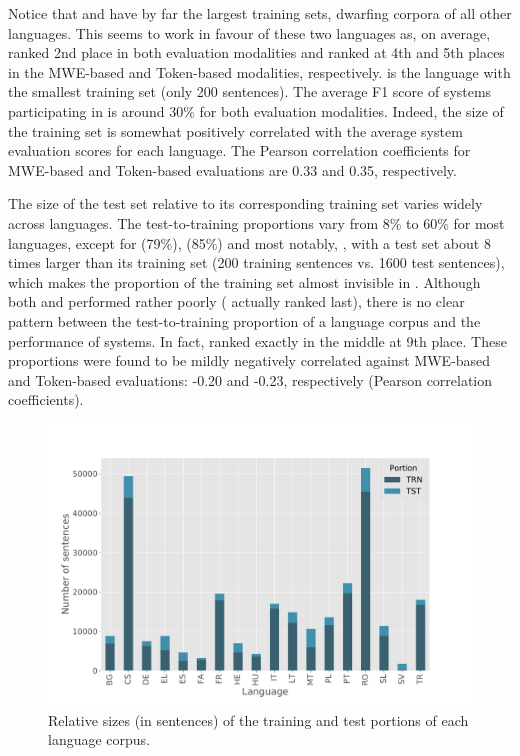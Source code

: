 \documentclass[output=paper
,modfonts
,nonflat,draftmode]{langsci/langscibook}
\begin{document}
Notice that  and  have by far the largest training sets, dwarfing corpora of all other languages. This seems to work in favour of these two languages as, on average,  ranked 2nd place in both evaluation modalities and  ranked at 4th and 5th places in the MWE-based and Token-based modalities, respectively.  is the language with the smallest training set (only 200 sentences). The average F1 score of systems participating in  is around 30\% for both evaluation modalities. Indeed, the size of the training set is somewhat positively correlated with the average system evaluation scores for each language. The Pearson correlation coefficients for MWE-based and Token-based evaluations are 0.33 and 0.35, respectively.

The size of the test set relative to its corresponding training set varies widely across languages. The test-to-training proportions vary from 8\% to 60\% for most languages, except for  (79\%),  (85\%) and most notably, , with a test set about 8 times larger than its training set (200 training sentences vs. 1600 test sentences), which makes the proportion of the training set almost invisible in . Although both  and  performed rather poorly ( actually ranked last), there is no clear pattern between the test-to-training proportion of a language corpus and the performance of systems. In fact,  ranked exactly in the middle at 9th place. These proportions were found to be mildly negatively correlated against MWE-based and Token-based evaluations: -0.20 and -0.23, respectively (Pearson correlation coefficients).

\begin{figure}
\includegraphics[scale=0.41]{figures/langcorpora-sizes-sents.pdf}
\caption{\label{fig:langcorp-sizes} Relative sizes (in sentences) of the training and test portions of each language corpus.}
\end{figure}
\end{document}
